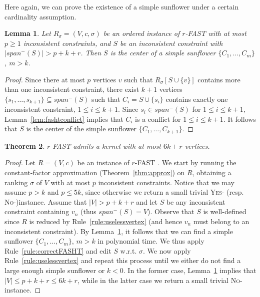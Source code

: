 \documentclass[11pt]{article}
\newtheorem{theorem}{Theorem}[section]
\newtheorem{lemma}[theorem]{Lemma}
\begin{document}
Here again, we can prove the existence of a simple sunflower under a certain cardinality assumption. 

\begin{lemma}
	\label{lem:correctrFAST}
	Let $R_\sigma = (V, c, \sigma)$ be an ordered instance of {\sc $r$-FAST}  with at most $p \geqslant 1$ inconsistent constraints, and $S$ be an inconsistent constraint with $|span^-(S)| > p + k + r$. Then $S$ is the center of a simple sunflower $\{C_1, \ldots, C_m\}$, $m > k$.
\end{lemma}

\begin{proof}
Since there at most $p$ vertices $v$ such that $R_\sigma[S \cup \{v\}]$ contains more than one inconsistent constraint, there exist $k + 1$ vertices $\{s_1, \ldots, s_{k+1}\} \subseteq span^-(S)$ such that $C_i = S \cup \{s_i\}$ contains exactly one inconsistent constraint, $1 \leqslant i \leqslant k+1$. Since $s_i \in span^-(S)$ for $1 \leqslant i \leqslant k +1$, Lemma~\ref{lem:fashtconflict} implies that $C_i$ is a conflict for $1 \leqslant i \leqslant k+1$. It follows that $S$ is the center of the simple sunflower $\{C_1, \ldots, C_{k+1}\}$.
 \end{proof}

\begin{theorem}
\label{thm:fasht}
	{\sc $r$-FAST} admits a kernel with at most $6k + r$ vertices.
\end{theorem}

\begin{proof}
	Let $R = (V, c)$ be an instance of {\sc $r$-FAST} . We start by running the constant-factor approximation (Theorem~\ref{thm:approx}) on $R$, obtaining a ranking $\sigma$ of $V$ with at most $p$ inconsistent constraints. Notice that we may assume $p > k$ and $p \leqslant 5k$, since otherwise we return a small trivial \textsc{Yes}- (resp. \textsc{No}-)instance. Assume that $|V| > p + k + r$ and let $S$ be any inconsistent constraint containing $v_n$ (thus $span^-(S) = V$). Observe that $S$ is well-defined since $R$ is reduced by Rule~\ref{rule:uselessvertex} (and hence $v_n$ must belong to an inconsistent constraint). 
	By Lemma~\ref{lem:correctrFAST}, it follows that we can find a simple sunflower $\{C_1, \ldots, C_m\}$, $m > k$ in polynomial time. We thus apply Rule~\ref{rule:correctFASHT} and edit $S$ w.r.t. $\sigma$. We now apply Rule~\ref{rule:uselessvertex} and repeat this process until we either do not find a large enough simple sunflower or $k < 0$. In the former case, Lemma~\ref{lem:correctrFAST} implies that $|V| \leqslant p + k + r \leqslant 6k + r$, while in the latter case we return a small trivial \textsc{No}-instance.  
 \end{proof}
\end{document}
